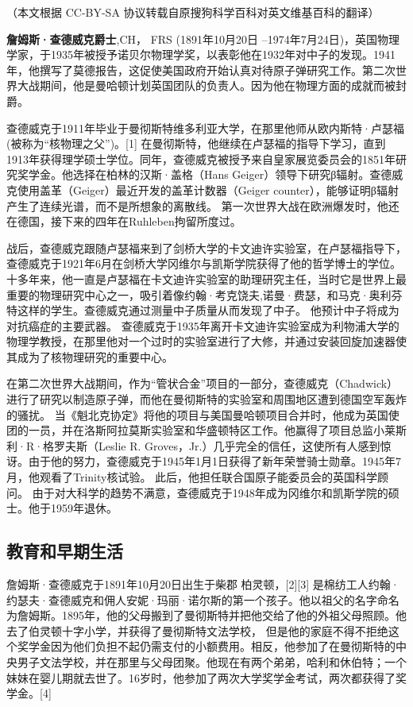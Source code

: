 
（本文根据 CC-BY-SA 协议转载自原搜狗科学百科对英文维基百科的翻译）

\textbf{詹姆斯·查德威克爵士},CH， FRS (1891年10月20日 –1974年7月24日)，英国物理学家，于1935年被授予诺贝尔物理学奖，以表彰他在1932年对中子的发现。1941年，他撰写了莫德报告，这促使美国政府开始认真对待原子弹研究工作。第二次世界大战期间，他是曼哈顿计划英国团队的负责人。因为他在物理方面的成就而被封爵。

查德威克于1911年毕业于曼彻斯特维多利亚大学，在那里他师从欧内斯特·卢瑟福 (被称为“核物理之父”)。[1] 在曼彻斯特，他继续在卢瑟福的指导下学习，直到1913年获得理学硕士学位。同年，查德威克被授予来自皇家展览委员会的1851年研究奖学金。他选择在柏林的汉斯·盖格（Hans Geiger）领导下研究β辐射。查德威克使用盖革（Geiger）最近开发的盖革计数器（Geiger counter），能够证明β辐射产生了连续光谱，而不是所想象的离散线。 第一次世界大战在欧洲爆发时，他还在德国，接下来的四年在Ruhleben拘留所度过。

战后，查德威克跟随卢瑟福来到了剑桥大学的卡文迪许实验室，在卢瑟福指导下，查德威克于1921年6月在剑桥大学冈维尔与凯斯学院获得了他的哲学博士的学位。十多年来，他一直是卢瑟福在卡文迪许实验室的助理研究主任，当时它是世界上最重要的物理研究中心之一，吸引着像约翰·考克饶夫,诺曼·费瑟，和马克·奥利芬特这样的学生。查德威克通过测量中子质量从而发现了中子。 他预计中子将成为对抗癌症的主要武器。 查德威克于1935年离开卡文迪许实验室成为利物浦大学的物理学教授，在那里他对一个过时的实验室进行了大修，并通过安装回旋加速器使其成为了核物理研究的重要中心。

在第二次世界大战期间，作为“管状合金”项目的一部分，查德威克（Chadwick）进行了研究以制造原子弹，而他在曼彻斯特的实验室和周围地区遭到德国空军轰炸的骚扰。 当《魁北克协定》将他的项目与美国曼哈顿项目合并时，他成为英国使团的一员，并在洛斯阿拉莫斯实验室和华盛顿特区工作。他赢得了项目总监小莱斯利·R·格罗夫斯（Leslie R. Groves，Jr.）几乎完全的信任，这使所有人感到惊讶。由于他的努力，查德威克于1945年1月1日获得了新年荣誉骑士勋章。1945年7月，他观看了Trinity核试验。 此后，他担任联合国原子能委员会的英国科学顾问。 由于对大科学的趋势不满意，查德威克于1948年成为冈维尔和凯斯学院的硕士。他于1959年退休。

\subsection{教育和早期生活}
詹姆斯·查德威克于1891年10月20日出生于柴郡 柏灵顿，[2][3] 是棉纺工人约翰·约瑟夫·查德威克和佣人安妮·玛丽·诺尔斯的第一个孩子。他以祖父的名字命名为詹姆斯。1895年，他的父母搬到了曼彻斯特并把他交给了他的外祖父母照顾。他去了伯灵顿十字小学，并获得了曼彻斯特文法学校， 但是他的家庭不得不拒绝这个奖学金因为他们负担不起仍需支付的小额费用。相反，他参加了在曼彻斯特的中央男子文法学校，并在那里与父母团聚。他现在有两个弟弟，哈利和休伯特；一个妹妹在婴儿期就去世了。16岁时，他参加了两次大学奖学金考试，两次都获得了奖学金。[4]

